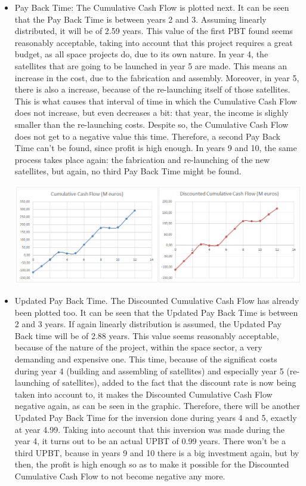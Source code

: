 \begin{itemize}
\item Pay Back Time: The Cumulative Cash Flow is plotted next. It can be seen that the Pay Back Time is between years 2 and 3. Assuming linearly distributed, it will be of 2.59 years. This value of the first PBT found seems reasonably acceptable, taking into account that this project requires a great budget, as all space projects do, due to its own nature. In year 4, the satellites that are going to be launched in year 5 are made. This means an increase in the cost, due to the fabrication and assembly. Moreover, in year 5, there is also a increase, because of the re-launching itself of those satellites. This is what causes that interval of time in which the Cumulative Cash Flow does not increase, but even decreases a bit: that year, the income is slighly smaller than the re-launching costs. Despite so, the Cumulative Cash Flow does not get to a negative value this time. Therefore, a second Pay Back Time can't be found, since profit is high enough. In years 9 and 10, the same process takes place again: the fabrication and re-launching of the new satellites, but again, no third Pay Back Time might be found. 

\includegraphics[width=140mm]{CCFTogether.png}


\item Updated Pay Back Time. The Discounted Cumulative Cash Flow has already been plotted too. It can be seen that the Updated Pay Back Time is between 2 and 3 years. If again linearly distribution is assumed, the Updated Pay Back time will be of 2.88 years. This value seems reasonably acceptable, because of the nature of the project, within the space sector, a very demanding and expensive one.
This time, because of the significat costs during year 4 (building and assembling of satellites) and especially year 5 (re-launching of satellites), added to the fact that the discount rate is now being taken into account to, it makes the Discounted Cumulative Cash Flow negative again, as can be seen in the graphic. Therefore, there will be another Updated Pay Back Time for the inversion done during years 4 and 5, exactly at year 4.99. Taking into account that this inversion was made during the year 4, it turns out to be an actual UPBT of 0.99 years. There won't be a third UPBT, bcause in years 9 and 10 there is a big investment again, but by then, the profit is high enough so as to make it possible for the Discounted Cumulative Cash Flow to not become negative any more. 



\end{itemize}
